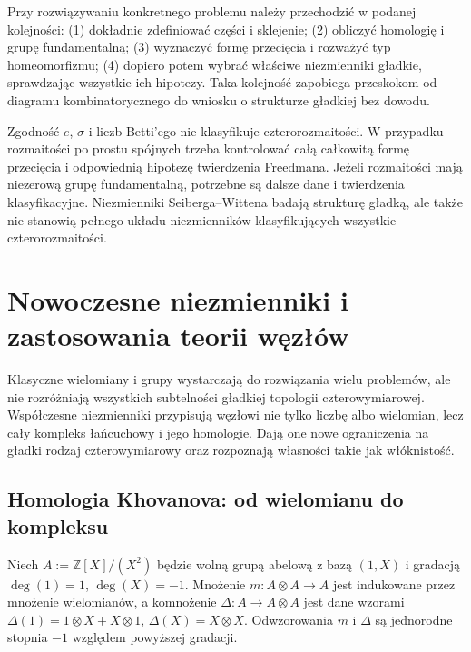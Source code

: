 \begin{uwaga}
Przy rozwiązywaniu konkretnego problemu należy przechodzić
w podanej kolejności: (1) dokładnie zdefiniować części i sklejenie;
(2) obliczyć homologię i grupę fundamentalną;
(3) wyznaczyć formę przecięcia i rozważyć typ homeomorfizmu;
(4) dopiero potem wybrać właściwe niezmienniki gładkie,
sprawdzając wszystkie ich hipotezy. Taka kolejność zapobiega
przeskokom od diagramu kombinatorycznego do wniosku o strukturze
gładkiej bez dowodu.
\end{uwaga}


\begin{uwaga}
Zgodność $e$, $\sigma$ i liczb Betti'ego nie klasyfikuje
czterorozmaitości. W przypadku rozmaitości po prostu
spójnych trzeba kontrolować całą całkowitą formę
przecięcia i odpowiednią hipotezę twierdzenia Freedmana.
Jeżeli rozmaitości mają niezerową grupę fundamentalną,
potrzebne są dalsze dane i twierdzenia klasyfikacyjne.
Niezmienniki Seiberga--Wittena badają strukturę gładką,
ale także nie stanowią pełnego układu niezmienników
klasyfikujących wszystkie czterorozmaitości.
\end{uwaga}

\chapter{Nowoczesne niezmienniki i zastosowania teorii węzłów}
\label{ch:kt-nowoczesne}

Klasyczne wielomiany i grupy wystarczają do rozwiązania wielu
problemów, ale nie rozróżniają wszystkich subtelności gładkiej
topologii czterowymiarowej. Współczesne niezmienniki przypisują
węzłowi nie tylko liczbę albo wielomian, lecz cały kompleks
łańcuchowy i jego homologie. Dają one nowe ograniczenia
na gładki rodzaj czterowymiarowy oraz rozpoznają własności
takie jak włóknistość.

\section{Homologia Khovanova: od wielomianu do kompleksu}
\label{sec:kt-khovanov}

\begin{definicja}
Niech $A:=\mathbb Z[X]/(X^2)$ będzie wolną grupą abelową
z bazą $(1,X)$ i gradacją $\deg(1)=1$, $\deg(X)=-1$.
Mnożenie $m\colon A\otimes A\to A$ jest indukowane przez
mnożenie wielomianów, a komnożenie
$\Delta\colon A\to A\otimes A$ jest dane wzorami
$\Delta(1)=1\otimes X+X\otimes1$,
$\Delta(X)=X\otimes X$. Odwzorowania $m$ i $\Delta$
są jednorodne stopnia $-1$ względem powyższej gradacji.
\end{definicja}

